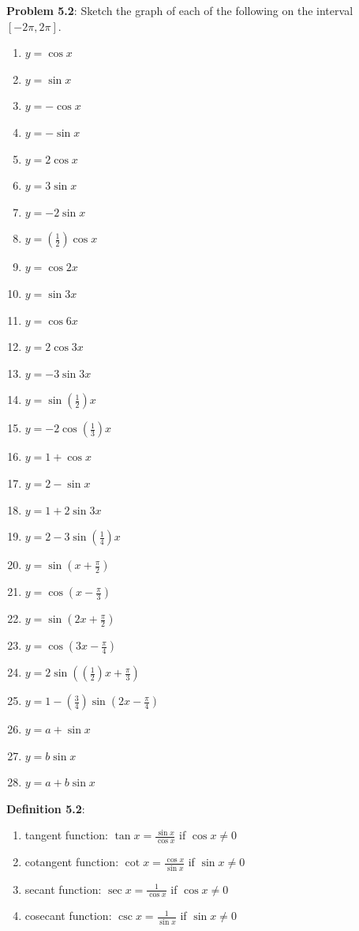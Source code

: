 \documentclass[english]{book}
\begin{document}
\textbf{Problem 5.2}: Sketch the graph of each of the following on the interval $[-2\pi, 2\pi]$.
\begin{enumerate}[\hspace{1cm}1)]
  \item $y=\cos x$
  \item $y=\sin x$
  \item $y=-\cos x$
  \item $y=-\sin x$
  \item $y=2\cos x$
  \item $y=3\sin x$
  \item $y=-2\sin x$
  \item $y=(\frac{1}{2})\cos x$
  \item $y=\cos 2x$
  \item $y=\sin 3x$
  \item $y=\cos 6x$
  \item $y=2\cos 3x$
  \item $y=-3\sin 3x$
  \item $y=\sin (\frac{1}{2})x$
  \item $y=-2\cos (\frac{1}{3})x$
  \item $y=1+\cos x$
  \item $y=2-\sin x$
  \item $y=1+2\sin 3x$
  \item $y=2-3\sin (\frac{1}{4})x$
  \item $y=\sin (x+\frac{\pi}{2})$
  \item $y=\cos (x-\frac{\pi}{3})$
  \item $y=\sin (2x+\frac{\pi}{2})$
  \item $y=\cos (3x-\frac{\pi}{4})$
  \item $y=2\sin ((\frac{1}{2})x+\frac{\pi}{3})$
  \item $y=1-(\frac{3}{4}) \sin (2x-\frac{\pi}{4})$
  \item $y=a+\sin x$
  \item $y=b\sin x$
  \item $y=a+b\sin x$
\end{enumerate}

\textbf{Definition 5.2}:
\begin{enumerate}[\hspace{1cm}1)]
  \item tangent function: $\tan x = \frac{\sin x}{\cos x}$ if $\cos x \neq 0$
  \item cotangent function: $\cot x = \frac{\cos x}{\sin x}$ if $\sin x \neq 0$
  \item secant function: $\sec x = \frac{1}{\cos x}$ if $\cos x \neq 0$
  \item cosecant function: $\csc x = \frac{1}{\sin x}$ if $\sin x \neq 0$
\end{enumerate}
\end{document}
